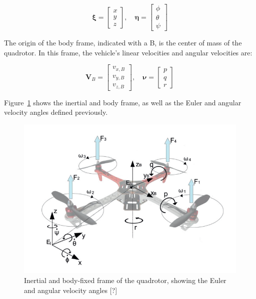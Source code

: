 \documentclass[letterpaper, 10 pt, conference]{ieeeconf}  %
\begin{document}
$$\bm{\xi}=\left[ \begin{array}{l}{x} \\ {y} \\ {z}\end{array}\right],
\quad \bm{\eta}=\left[ \begin{array}{l}{\phi} \\ {\theta} \\ {\psi}\end{array}\right]$$

The origin of the body frame, indicated with a B, is the center of mass of the quadrotor. In this frame, the vehicle's linear velocities  and angular velocities \bm{$\nu$} are:

$$\bm{V}_{B}=\left[ \begin{array}{c}{v_{x, B}} \\ {v_{y, B}} \\ {v_{z, B}}\end{array}\right], \quad \bm{\nu}=\left[ \begin{array}{l}{p} \\ {q} \\ {r}\end{array}\right]$$

Figure~\ref{fig:quad_frame} shows the inertial and body frame, as well as the Euler and angular velocity angles defined previously.

\begin{figure}[!htpb]
	\centering
	\includegraphics[width=1.0\linewidth]{Images/quad_frame.png}
	\caption{Inertial and body-fixed frame of the quadrotor, showing the Euler and angular velocity angles [?] %
		}
	\label{fig:quad_frame}
\end{figure}
\end{document}
